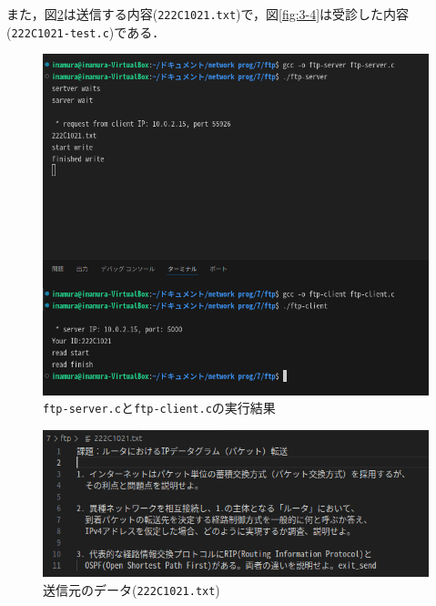 \documentclass[documentclass]{jsarticle}
\begin{document}
また，図\ref*{fig:3-3}は送信する内容(\texttt{222C1021.txt})で，図\ref*{fig:3-4}は受診した内容(\texttt{222C1021-test.c})である．




\begin{figure}[H]
  \begin{center}
    \includegraphics*[scale=0.7]{figure/3-2.png}
  \end{center}
  \caption{\texttt{ftp-server.c}と\texttt{ftp-client.c}の実行結果}
  \label{fig:3-2}
\end{figure}

\begin{figure}[H]
  \begin{center}
    \includegraphics*[]{figure/3-3.png}
  \end{center}
  \caption{送信元のデータ(\texttt{222C1021.txt})}
  \label{fig:3-3}
\end{figure}
\end{document}
